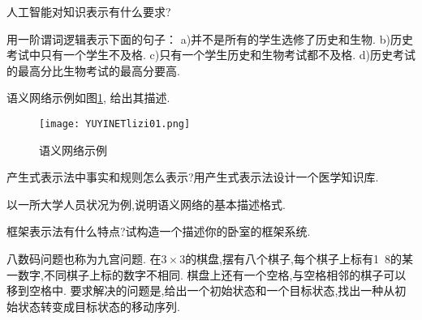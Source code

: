 \begin{think}
  人工智能对知识表示有什么要求?
\end{think}

\begin{think}
用一阶谓词逻辑表示下面的句子： a)并不是所有的学生选修了历史和生物.  b)历史考试中只有一个学生不及格.
c)只有一个学生历史和生物考试都不及格. d)历史考试的最高分比生物考试的最高分要高.
\end{think}

\begin{think}
语义网络示例如图\ref{YUYINETlizi01}, 给出其描述.
\begin{figure}[H]
\centering
\texttt{[image: YUYINETlizi01.png]}
\caption{语义网络示例}
\label{YUYINETlizi01}
\end{figure}
\end{think}

\begin{think}
  产生式表示法中事实和规则怎么表示?用产生式表示法设计一个医学知识库.
\end{think}

\begin{think}
  以一所大学人员状况为例,说明语义网络的基本描述格式.
\end{think}

\begin{think}
  框架表示法有什么特点?试构造一个描述你的卧室的框架系统.
\end{think}

\begin{think}
  八数码问题也称为九宫问题. 在$3\times 3$的棋盘,摆有八个棋子,每个棋子上标有1~8的某一数字,不同棋子上标的数字不相同. 棋盘上还有一个空格,与空格相邻的棋子可以移到空格中.
  要求解决的问题是,给出一个初始状态和一个目标状态,找出一种从初始状态转变成目标状态的移动序列.
\end{think}


